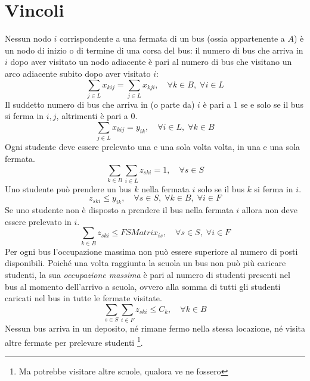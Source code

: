 \section{Vincoli}
Nessun nodo $i$ corrispondente a una fermata di un bus (ossia appartenente a $A$) è un nodo di inizio o di termine di una corsa del bus: il numero di bus che arriva in $i$ dopo aver visitato un nodo adiacente è pari al numero di bus che visitano un arco adiacente subito dopo aver visitato $i$:
\begin{equation}
    \sum_{j \in L} x_{kij} = \sum_{j \in L} x_{kji},\quad \forall k \in B,\;\forall i \in L
\end{equation}
Il suddetto numero di bus che arriva in (o parte da) $i$ è pari a 1 se e solo se il bus si ferma in $i,j$, altrimenti è pari a 0.
\begin{equation}
    \sum_{j \in L} x_{kij} = y_{ik},\quad \forall i \in L,\; \forall k \in B 
\end{equation}
Ogni studente deve essere prelevato una e una sola volta volta, in una e una sola fermata.
\begin{equation}
    \sum_{k \in B}\sum_{i \in L} z_{ski} = 1,\quad \forall s \in S
\end{equation}
Uno studente può prendere un bus $k$ nella fermata $i$ solo se il bus $k$ si ferma in $i$.
\begin{equation}
    z_{ski} \leq y_{ik},\quad \forall s \in S,\;\forall k \in B,\;\forall i \in F
\end{equation}
Se uno studente non è disposto a prendere il bus nella fermata $i$ allora non deve essere prelevato in $i$.
\begin{equation}
    \sum_{k \in B} z_{ski} \leq FSMatrix_{is},\quad \forall s \in S,\;\forall i \in F
\end{equation}
Per ogni bus l'occupazione massima non può essere superiore al numero di posti disponibili. Poiché una volta raggiunta la scuola un bus non può più caricare studenti, la sua \textit{occupazione massima} è pari al numero di studenti presenti nel bus al momento dell'arrivo a scuola, ovvero alla somma di tutti gli studenti caricati nel bus in tutte le fermate visitate. 
\begin{equation}
    \sum_{s \in S}\sum_{i \in F}z_{ski} \leq C_{k},\quad \forall k \in B
\end{equation}
Nessun bus arriva in un deposito, né rimane fermo nella stessa locazione, né visita altre fermate per prelevare studenti \footnote{Ma potrebbe visitare altre scuole, qualora ve ne fossero}.
